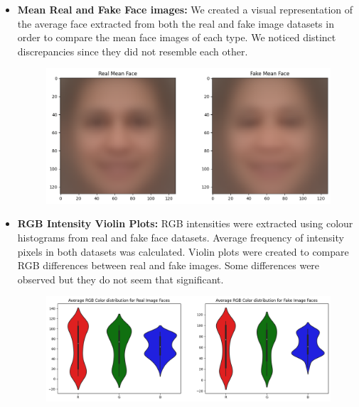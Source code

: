 \documentclass[10pt,twocolumn,letterpaper]{article}
\begin{document}
\begin{itemize}
    \item \textbf{Mean Real and Fake Face images:} We created a visual representation of the average face extracted from both the real and fake image datasets in order to compare the mean face images of each type. We noticed distinct discrepancies since they did not resemble each other.
    \begin{figure}[h]
    \centering
    \includegraphics[scale=0.25]{4.png}
    \end{figure}

    \item \textbf{RGB Intensity Violin Plots:} RGB intensities were extracted using colour histograms from real and fake face datasets. Average frequency of intensity pixels in both datasets was calculated. Violin plots were created to compare RGB differences between real and fake images. Some differences were observed but they do not seem that significant.
    \begin{figure}[h]
    \centering
    \includegraphics[width=\linewidth]{5.png}
    \end{figure}


\end{itemize}
\end{document}

